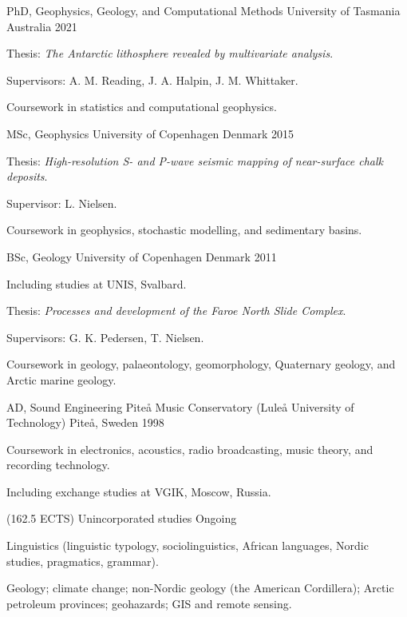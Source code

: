 \documentclass[11pt, a4paper]{cvClass}
\begin{document}
\begin{cventries}
  \cventry
    {PhD, Geophysics, Geology, and Computational Methods}
    {University of Tasmania}
    {Australia}
    {2021}
    {
      \begin{cvitems}
        \item Thesis: \textit{The Antarctic lithosphere revealed by multivariate analysis}.
        \item Supervisors: A. M. Reading, J. A. Halpin, J. M. Whittaker.
        \item Coursework in statistics and computational geophysics.
      \end{cvitems}
    }

  \cventry
    {MSc, Geophysics}
    {University of Copenhagen}
    {Denmark}
    {2015}
    {
      \begin{cvitems}
        \item Thesis: \textit{High-resolution S- and P-wave seismic mapping of near-surface chalk deposits}.
        \item Supervisor: L. Nielsen.
        \item Coursework in geophysics, stochastic modelling, and sedimentary basins.
      \end{cvitems}
    }

  \cventry
    {BSc, Geology}
    {University of Copenhagen}
    {Denmark}
    {2011}
    {
      \begin{cvitems}
        \item Including studies at UNIS, Svalbard.
        \item Thesis: \textit{Processes and development of the Faroe North Slide Complex}.
        \item Supervisors: G. K. Pedersen, T. Nielsen.
        \item Coursework in geology, palaeontology, geomorphology, Quaternary geology, and Arctic marine geology.
      \end{cvitems}
    }

  \cventry
    {AD, Sound Engineering}
    {Piteå Music Conservatory (Luleå University of Technology)}
    {Piteå, Sweden}
    {1998}
    {
      \begin{cvitems}
        \item Coursework in electronics, acoustics, radio broadcasting, music theory, and recording technology.
        \item Including exchange studies at VGIK, Moscow, Russia.
      \end{cvitems}
    }

  \cventry
    {(162.5 ECTS)}
    {Unincorporated studies}
    {}
    {Ongoing}
    {
      \begin{cvitems}
        \item Linguistics (linguistic typology, sociolinguistics, African languages, Nordic studies, pragmatics, grammar).
        \item Geology; climate change; non-Nordic geology (the American Cordillera); Arctic petroleum provinces; geohazards; GIS and remote sensing.
      \end{cvitems}
    }
\end{cventries}
\end{document}
